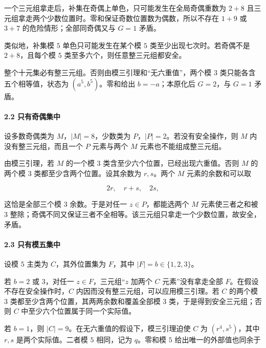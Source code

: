 {一个三元组拿走后，补集在奇偶上单色，只可能发生在全局奇偶重数为} \(2+8\) {且三元组拿走两个少数位置时。零和保证奇数位置数为偶数，所以不存在} \(1+9\) {或} \(3+7\) {的危险情形；全部同奇偶又与} \(G=1\) {矛盾。}

{类似地，补集模} \(5\) {单色只可能发生在某个模} \(5\) {类至少出现七次时。若奇偶不是} \(2+8\){，且每个模} \(5\) {类至多六个，则任意整三元组都安全。}

{整个十元集必有整三元组。否则由模三引理和``无六重值''，两个模} \(3\) {类只能各含五个相等值，状态为} \((a^5,b^5)\){。零和给出} \(b=-a\){；本原化后} \(G=2\){，与} \(G=1\) {矛盾。}

\paragraph*{\texorpdfstring{{2.2} {只有奇偶集中}}{2.2 只有奇偶集中}}\label{C35-h232}

{设多数奇偶类为} \(M\){，}\(|M|=8\){，少数类为} \(P\){，}\(|P|=2\){。若没有安全操作，则} \(M\) {内没有整三元组，而且一个} \(P\) {元素与两个} \(M\) {元素也不能组成整三元组。}

{由模三引理，若} \(M\) {的一个模} \(3\) {类含至少六个位置，已经出现六重值。否则} \(M\) {的两个模} \(3\) {类都至少含两个位置。设其余数为} \(r,s\){。两个} \(M\) {元素的余数和可以取}

\[
2r,\quad r+s,\quad2s,
\]

{这恰是全部三个模} \(3\) {余数。于是对任一} \(z\in P\){，都能选两个} \(M\) {元素使三者之和被} \(3\) {整除；奇偶不同又保证三者不全相等。该三元组只拿走一个少数位置，故安全，矛盾。}

\paragraph*{\texorpdfstring{{2.3} {只有模五集中}}{2.3 只有模五集中}}\label{C35-h233}

{设模} \(5\) {主类为} \(C\){，其外位置集为} \(F\){，其中} \(|F|=b\in\{1,2,3\}\){。}

{若} \(b=2\) {或} \(3\){，对任一} \(z\in F\){，三元组``}\(z\) {加两个} \(C\) {元素''没有拿走全部} \(F\){。在假设不存在安全操作时，}\(C\) {内因而没有整三元组，可以应用模三引理。若} \(C\) {的两个模} \(3\) {类都至少含两个位置，其两两余数和覆盖全部模} \(3\) {类，于是得到安全三元组；否则} \(C\) {中至少六个位置属于同一个实际值。}

{若} \(b=1\){，则} \(|C|=9\){。在无六重值的假设下，模三引理迫使} \(C\) {为} \((r^4,s^5)\){，其中} \(r,s\) {是两个实际值。二者模} \(5\) {相同，记为} \(q\){。零和模} \(5\) {给出唯一的外部值也同余于}

